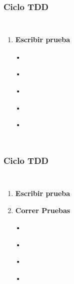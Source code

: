 \documentclass{beamer}
\begin{document}
\begin{frame}
\frametitle{Ciclo TDD}
\begin{columns}[c] %

\begin{enumerate}
\item \textbf{Escribir prueba}
\item[•]	
\item[•]	
\item[•]	
\item[•]	
\item[•]	
\end{enumerate}

\end{columns}
\end{frame}


\begin{frame}
\frametitle{Ciclo TDD}
\begin{columns}[c] %

\begin{enumerate}
\item \textbf{Escribir prueba}
\item {\color{red}\textbf{Correr Pruebas}}
\item[•]	
\item[•]	
\item[•]	
\item[•]	
\end{enumerate}

\end{columns}
\end{frame}
\end{document}
